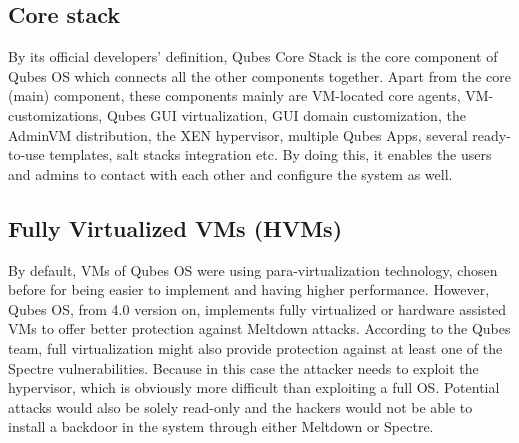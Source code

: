 \documentclass[runningheads,a4paper]{article}
\begin{document}
\subsection{Core stack}
By its official developers’ definition, Qubes Core Stack is the core component of Qubes OS which connects all the other components together. Apart from the core (main) component, these components mainly are VM-located core agents, VM-customizations, Qubes GUI virtualization, GUI domain customization, the AdminVM distribution, the XEN hypervisor, multiple Qubes Apps, several ready-to-use templates, salt stacks integration etc.
By doing this, it enables the users and admins to contact with each other and configure the system as well. 

\subsection{Fully Virtualized VMs (HVMs)}
By default, VMs of Qubes OS were using para-virtualization technology, chosen before for being easier to implement and having higher performance. However, Qubes OS, from 4.0 version on, implements fully virtualized or hardware assisted VMs to offer better protection against Meltdown attacks. According to the Qubes team, full virtualization might also provide protection against at least one of the Spectre vulnerabilities. Because in this case the attacker needs to exploit the hypervisor, which is obviously more difficult than exploiting a full OS. Potential attacks would also be solely read-only and the hackers would not be able to install a backdoor in the system through either Meltdown or Spectre. 






\end{document}
